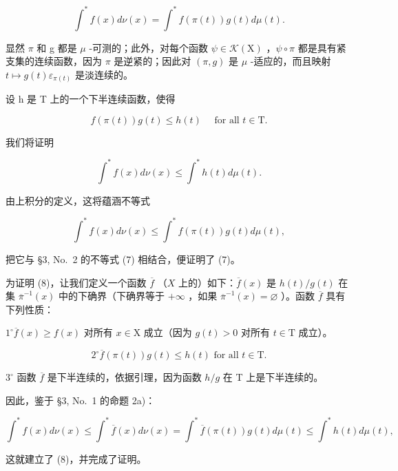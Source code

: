 \[
\int^ {*} f (x) d \nu (x) = \int^ {*} f (\pi (t)) g (t) d \mu (t).\tag{7}
\]

显然 \(\pi\) 和 g 都是 \(\mu\) -可测的；此外，对每个函数 \(\psi \in \mathcal{K}(\mathrm{X})\) ，\(\psi \circ \pi\) 都是具有紧支集的连续函数，因为 \(\pi\) 是逆紧的；因此对 \((\pi, g)\) 是 \(\mu\) -适应的，而且映射 \(t \mapsto g(t) \varepsilon_{\pi(t)}\) 是淡连续的。

设 h 是 T 上的一个下半连续函数，使得

\[
f (\pi (t)) g (t) \leqslant h (t) \quad \text { for   all } t \in \mathrm{T}.
\]

我们将证明

\[
\int^ {*} f (x) d \nu (x) \leqslant \int^ {*} h (t) d \mu (t).\tag{8}
\]

由上积分的定义，这将蕴涵不等式

\[
\int^ {*} f (x) d \nu (x) \leqslant \int^ {*} f (\pi (t)) g (t) d \mu (t),
\]

把它与 §3, No.~2 的不等式 (7) 相结合，便证明了 (7)。

为证明 (8)，让我们定义一个函数 \(\overline{f}\) （\(X\) 上的）如下：\(\overline{f}(x)\) 是 \(h(t) / g(t)\) 在集 \(\overline{\pi}^{-1}(x)\) 中的下确界（下确界等于 \(+\infty\) ，如果 \(\overline{\pi}^{-1}(x) = \varnothing\) ）。函数 \(\overline{f}\) 具有下列性质：

\(1^{\circ}\overline{f} (x)\geqslant f(x)\) 对所有 \(x\in \mathrm{X}\) 成立（因为 \(g(t) > 0\) 对所有 \(t\in \mathrm{T}\) 成立）。

\[
2 ^ {\circ} \overline {{f}} (\pi (t)) g (t) \leqslant h (t) \text {   for   all   } t \in \mathrm{T}.
\]

\(3^{\circ}\) 函数 \(\overline{f}\) 是下半连续的，依据引理，因为函数 \(h / g\) 在 T 上是下半连续的。

因此，鉴于 §3, No.~1 的命题 2a)：

\[
\int^ {*} f (x) d \nu (x) \leqslant \int^ {*} \overline {{{f}}} (x) d \nu (x) = \int^ {*} \overline {{{f}}} (\pi (t)) g (t) d \mu (t) \leqslant \int^ {*} h (t) d \mu (t),
\]

这就建立了 (8)，并完成了证明。

